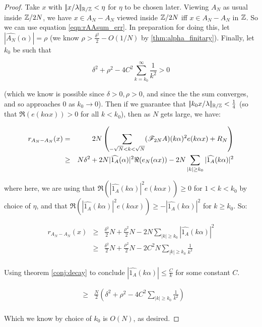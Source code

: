 \documentclass{article}
\theoremstyle{definition}
\theoremstyle{remark}
\numberwithin{equation}{section}
\begin{document}
\begin{proof}
  Take $x$ with $|\!|x/\lambda|\!|_{\mathbb{R}/\mathbb{Z}} < \eta$ for $\eta$ to be chosen
  later.  Viewing $A_N$ as usual inside $\mathbb{Z}/2N$, we have
  $x \in A_N - A_N$ viewed inside $\mathbb{Z}/2N$ iff $x \in A_N - A_N$ in
  $\mathbb{Z}$.  So we can use equation \ref{eqn:rAAsum_err}.  In preparation
  for doing this, let $|\widehat{A_N}(\alpha)| = \rho$ (we know
  $\rho > \frac{\delta^2}{2} - O(1/N)$ by \ref{thm:alpha_finitary}).
  Finally, let $k_0$ be such that

  \[\delta^2 + \rho^2 - 4 C^2 \sum_{k=k_0}^\infty \frac{1}{k^2} > 0\]

  (which we know is possible since $\delta > 0, \rho > 0$, and since
  the the sum converges, and so approaches 0 as $k_0 \to 0$).  Then if
  we guarantee that $|\!|k_0 x/\lambda|\!|_{\mathbb{R}/\mathbb{Z}} < \frac14$ (so that
  $\Re(e(k\alpha x)) > 0$ for all $k < k_0$), then as $N$ gets large, we
  have:

  \begin{eqnarray*}
    r_{A_N - A_N}(x) &=& 2N \left(\sum_{-\sqrt{N} < k < \sqrt{N}}
                       (\mathscr{F}_{2N}A)(k\alpha)^2 e(k\alpha x) + R_N\right)\\
                     &\geq& N \delta^2 + 2N
                            |\widehat{1_A}(\alpha)|^2
                            \Re(e_N(\alpha x)) - 2N \sum_{|k| \geq k_0}
                            |\widehat{1_A}(k\alpha)|^2\\
  \end{eqnarray*}

  where here, we are using that
  $\Re(|\widehat{1_A}(k\alpha)|^2 e(k\alpha x)) \geq 0$ for
  $1 < k < k_0$ by choice of $\eta$, and that
  $\Re(|\widehat{1_A}(k\alpha)|^2 e(k\alpha x)) \geq
  -|\widehat{1_A}(k\alpha)|^2$ for $k \geq k_0$.  So: 

  \begin{eqnarray*}
    r_{A_N - A_N}(x) &\geq& \frac{\delta^2}{2} N + \frac{\rho^2}{2} N
                            - 2N \sum_{|k| \geq k_0} |\widehat{1_A}(k\alpha)|^2\\
                     &\geq& \frac{\delta^2}{2} N + \frac{\rho^2}{2} N
                            - 2C^2 N \sum_{|k| \geq k_0}
                            \frac{1}{k^2}\\
  \end{eqnarray*}


  Using theorem \ref{conj:decay} to conclude
  $|\widehat{1_A}(k\alpha)| \leq \frac{C}{k}$ for some constant $C$.

  \begin{eqnarray*}
    &\geq& \frac{N}{2}\left(\delta^2 + \rho^2 - 4C^2 \sum_{|k| \geq k_0} \frac{1}{k^2}\right)\\
  \end{eqnarray*}
  
  Which we know by choice of $k_0$ is $O(N)$, as desired.  

\end{proof}
\end{document}
